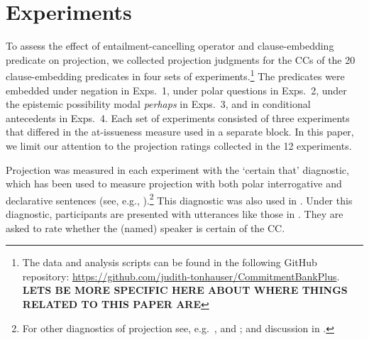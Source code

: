 \documentclass[a4paper,12pt,twoside]{article}
\begin{document}
  


\section{Experiments}

	To assess the effect of entailment-cancelling operator and clause-embedding predicate on projection, we collected projection judgments for the CCs of the 20 clause-embedding predicates in four sets of experiments.\footnote{The data and analysis scripts can be found in the following GitHub repository: \url{https://github.com/judith-tonhauser/CommitmentBankPlus}. {\bf LETS BE MORE SPECIFIC HERE ABOUT WHERE THINGS RELATED TO THIS PAPER ARE}} The predicates were embedded under negation in Exps.~1, under polar questions in Exps.~2, under the epistemic possibility modal {\em perhaps} in Exps.~3, and in conditional antecedents in Exps.~4. Each set of experiments consisted of three experiments that differed in the at-issueness measure used in a separate block. In this paper, we limit our attention to the projection ratings collected in the 12 experiments.

	Projection was measured in each experiment with the `certain that' diagnostic, which has been used to measure projection with both polar interrogative and declarative sentences (see, e.g., \citealt{tonhauser_prosodic_2016,djarv_prosodic_2017,stevens_rational_2017,lorson_influence_2018,tonhauser_how_2018,mahler_does_2019,mahler_social_2020,de_marneffe_commitmentbank_2019}).\footnote{For other diagnostics of projection see, e.g.\ \citealt{smith_projection_2011,xue_correlation_2011}, and \citealt{tonhauser_toward_2013}; and discussion in \citealt{tonhauser_how_2018}.} This diagnostic was also used in \citealt{sieker_projective_2022}. Under this diagnostic, participants are presented with utterances like those in \Next. They are asked to rate whether the (named) speaker is certain of the CC. 
\end{document}
